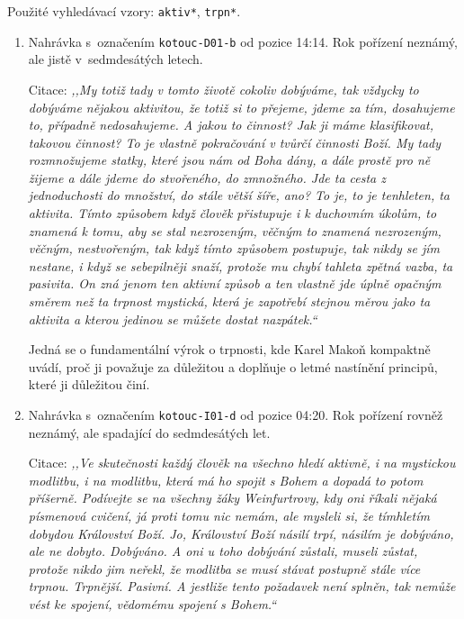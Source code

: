 Použité vyhledávací vzory: \texttt{aktiv*}, \texttt{trpn*}.

\begin{enumerate}
  \item{
    Nahrávka s~označením \texttt{kotouc-D01-b} od pozice 14:14. Rok pořízení neznámý, ale
    jistě v~sedmdesátých letech.

    Citace: \textit{%
      ,,My totiž tady v tomto životě cokoliv dobýváme, tak vždycky to dobýváme
      nějakou aktivitou, že totiž si to přejeme, jdeme za tím, dosahujeme to,
      případně nedosahujeme. A jakou to činnost? Jak ji máme klasifikovat,
      takovou činnost? To je vlastně pokračování v tvůrčí činnosti Boží. My tady
      rozmnožujeme statky, které jsou nám od Boha dány, a dále prostě pro ně
      žijeme a dále jdeme do stvořeného, do zmnožného. Jde ta cesta z
      jednoduchosti do množství, do stále větší šíře, ano? To je, to je
      tenhleten, ta aktivita. Tímto způsobem když člověk přistupuje i k
      duchovním úkolům, to znamená k tomu, aby se stal nezrozeným, věčným to
      znamená nezrozeným, věčným, nestvořeným, tak když tímto způsobem
      postupuje, tak nikdy se jím nestane, i když se sebepilněji snaží, protože
      mu chybí tahleta zpětná vazba, ta pasivita. On zná jenom ten aktivní
      způsob a ten vlastně jde úplně opačným směrem než ta trpnost mystická,
      která je zapotřebí stejnou měrou jako ta aktivita a kterou jedinou se
      můžete dostat nazpátek.``
    }

    Jedná se o fundamentální výrok o trpnosti, kde Karel Makoň kompaktně uvádí,
    proč ji považuje za důležitou a doplňuje o letmé nastínění principů, které
    ji důležitou činí.
  }
  \item{
    Nahrávka s~označením \texttt{kotouc-I01-d} od pozice 04:20. Rok pořízení rovněž neznámý, ale
    spadající do sedmdesátých let.

    Citace: \textit{%
      ,,Ve skutečnosti každý člověk na všechno hledí aktivně, i na mystickou
      modlitbu, i na modlitbu, která má ho spojit s Bohem a dopadá to potom
      příšerně. Podívejte se na všechny žáky Weinfurtrovy, kdy oni říkali
      nějaká písmenová cvičení, já proti tomu nic nemám, ale mysleli si, že
      tímhletím dobydou Království Boží. Jo, Království Boží násilí trpí,
      násilím je dobýváno, ale ne dobyto. Dobýváno. A oni u toho dobývání
      zůstali, museli zůstat, protože nikdo jim neřekl, že modlitba se musí
      stávat postupně stále více trpnou. Trpnější. Pasivní. A jestliže tento
      požadavek není splněn, tak nemůže vést ke spojení, vědomému spojení s
      Bohem.``
    }

}
\end{enumerate}
